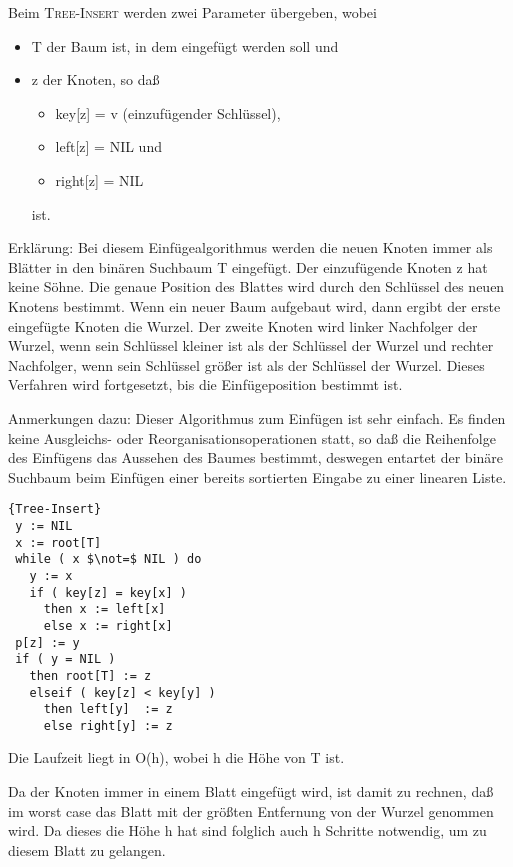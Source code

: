 \documentclass[ngerman,draft,parskip=half*,twoside]{scrreprt}
\theoremstyle{break}
\begin{document}
  	\begin{description}
			\item{Beim \textsc{Tree-Insert} werden zwei Parameter übergeben, wobei}
			\begin{itemize}
				\item T der Baum ist, in dem eingefügt werden soll und
		 		\item z der Knoten, so daß	
		 		\begin{itemize}
					\item key[z]   = v (einzufügender Schlüssel),
					\item left[z]  = NIL und
					\item right[z] = NIL
				\end{itemize}
				ist.
			\end{itemize}
		\end{description}
 	Erklärung:
	Bei diesem Einfügealgorithmus werden die neuen Knoten immer als 
	Blätter in den binären Suchbaum T eingefügt. Der einzufügende 
	Knoten z hat keine Söhne. Die genaue Position des Blattes wird 
	durch den Schlüssel des neuen Knotens bestimmt. Wenn ein neuer 
	Baum aufgebaut wird, dann ergibt der erste eingefügte Knoten die 
	Wurzel. Der zweite Knoten wird linker Nachfolger der Wurzel, wenn 
	sein Schlüssel kleiner ist als der Schlüssel der Wurzel und rechter 
	Nachfolger, wenn sein Schlüssel größer ist als der Schlüssel der 
	Wurzel. Dieses Verfahren wird fortgesetzt, bis die Einfügeposition bestimmt ist.

	Anmerkungen dazu:
	Dieser Algorithmus zum Einfügen ist sehr einfach. Es finden keine 
	Ausgleichs- oder Reorganisationsoperationen statt, so daß die 
	Reihenfolge des Einfügens das Aussehen des Baumes bestimmt, deswegen 
	entartet der binäre Suchbaum beim Einfügen einer bereits sortierten Eingabe
	zu einer linearen Liste. 

\begin{Algorithmus}
\begin{lstlisting}[frame=tlrb, mathescape=true, title=\textsc{Tree-Insert}, gobble=1]{Tree-Insert}
 y := NIL
 x := root[T]
 while ( x $\not=$ NIL ) do
   y := x
   if ( key[z] = key[x] ) 
     then x := left[x]
     else x := right[x]
 p[z] := y
 if ( y = NIL )
   then root[T] := z
   elseif ( key[z] < key[y] )
     then left[y]  := z
     else right[y] := z    
	    \end{lstlisting}

Die Laufzeit liegt in O(h), wobei h die Höhe von T ist.
\end{Algorithmus}    
    Da der Knoten immer in einem Blatt eingefügt wird, ist damit zu rechnen,
    daß im worst case das Blatt mit der größten Entfernung von der Wurzel
    genommen wird. Da dieses die Höhe h hat sind folglich auch h Schritte
    notwendig, um zu diesem Blatt zu gelangen.
        
\end{document}
